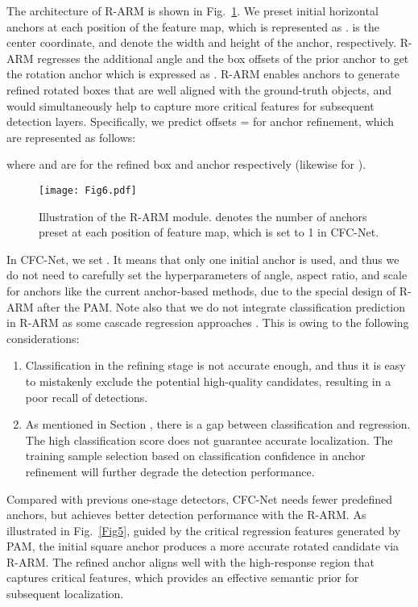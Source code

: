\documentclass[journal]{IEEEtran}
\begin{document}
The architecture of R-ARM is shown in Fig.~\ref{Fig6}. We preset  initial horizontal anchors at each position of the feature map, which is represented as .  is the center coordinate, and  denote the width and height of the anchor, respectively. R-ARM regresses the additional angle   and the box offsets of the prior anchor to get the rotation anchor which is expressed as . R-ARM enables anchors to generate refined rotated boxes that are well aligned with the ground-truth objects, and would simultaneously help to capture more critical features for subsequent detection layers. Specifically, we predict offsets  =  for anchor refinement, which are represented as follows:

where  and  are for the refined box and anchor respectively (likewise for ). 


\begin{figure}[t]
	\centering
	\texttt{[image: Fig6.pdf]} 
	\caption{Illustration of the R-ARM module.  denotes the number of anchors preset at each position of feature map, which is set to 1 in CFC-Net.}
	\label{Fig6}
\end{figure}

In CFC-Net, we set . It means that only one initial anchor is used, and thus we do not need to carefully set the hyperparameters of angle, aspect ratio, and scale for anchors like the current anchor-based methods, due to the special design of R-ARM after the PAM. Note also that we do not integrate classification prediction in R-ARM as some cascade regression approaches \cite{yang2019r3det, tian2019cascaded}. This is owing to the following considerations: 
\begin{enumerate}
\item [1.] Classification in the refining stage is not accurate enough, and thus it is easy to mistakenly exclude the potential high-quality candidates, resulting in a poor recall of detections.
\item [2.] As mentioned in Section \uppercase\expandafter{}, there is a gap between classification and regression. The high classification score does not guarantee accurate localization. The training sample selection based on classification confidence in anchor refinement will further degrade the detection performance.
\end{enumerate}

Compared with previous one-stage detectors, CFC-Net needs fewer predefined anchors, but achieves better detection performance with the R-ARM. As illustrated in Fig.~\ref{Fig5}, guided by the critical regression features generated by PAM, the initial square anchor produces a more accurate rotated candidate via R-ARM. The refined anchor aligns well with the high-response region that captures critical features, which provides an effective semantic prior for subsequent localization.
\end{document}
